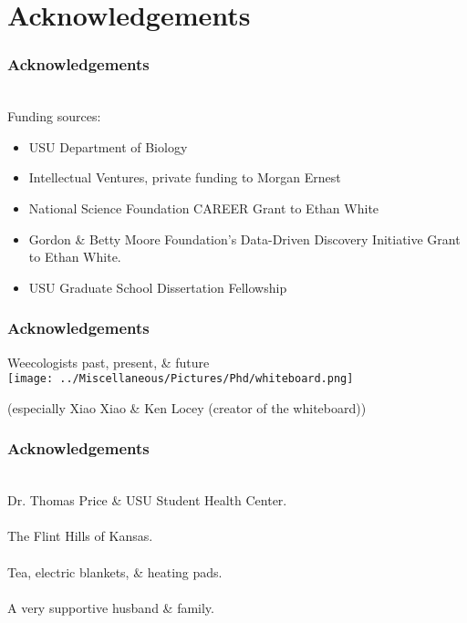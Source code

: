 \documentclass[14pt]{beamer}
\begin{document}
\section{Acknowledgements}
\begin{frame}[t]{}
\frametitle{Acknowledgements}
~\\ %
\small{Funding sources:}
\begin{small}
\begin{itemize}
\item USU Department of Biology
\item Intellectual Ventures, private funding to Morgan Ernest
\item National Science Foundation CAREER Grant to Ethan White
\item Gordon \& Betty Moore Foundation's Data-Driven Discovery Initiative Grant to Ethan White.
\item USU Graduate School Dissertation Fellowship
\end{itemize}
\end{small}
\end{frame}

\begin{frame}{}
\frametitle{Acknowledgements}
Weecologists past, present, \& future\\
\texttt{[image: ../Miscellaneous/Pictures/Phd/whiteboard.png]}
\begin{tiny}
(especially Xiao Xiao \& Ken Locey (creator of the whiteboard))
\end{tiny}
\end{frame}

\begin{frame}[t]{}
\frametitle{Acknowledgements}
~\\ %
Dr. Thomas Price \& USU Student Health Center.\\
~\\
The Flint Hills of Kansas.\\
~\\
Tea, electric blankets, \& heating pads.\\
~\\
A very supportive husband \& family.\\
\end{frame}
\end{document}
